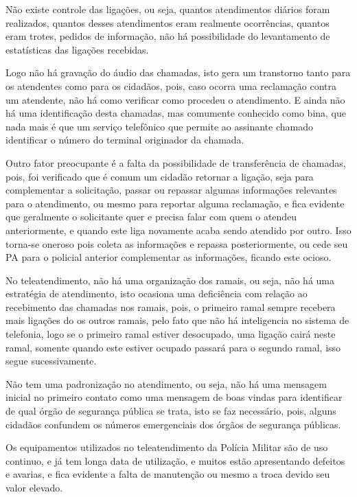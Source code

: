 Não existe controle das ligações, ou seja, quantos atendimentos diários foram realizados, quantos desses atendimentos eram realmente ocorrências, quantos eram trotes, pedidos de informação, não há possibilidade do levantamento de estatísticas das ligações recebidas.

Logo não há gravação do áudio das chamadas, isto gera um transtorno tanto para os atendentes como para os cidadãos, pois, caso ocorra uma reclamação contra um atendente, não há como verificar como procedeu o atendimento. E ainda não há uma identificação desta chamadas, mas comumente conhecido como bina, que nada mais é que um serviço telefônico que permite ao assinante chamado identificar o número do terminal originador da chamada.

Outro fator preocupante é a falta da possibilidade de transferência de chamadas, pois, foi verificado que é comum um cidadão retornar a ligação, seja para complementar a solicitação, passar ou repassar algumas informações relevantes para o atendimento, ou mesmo para reportar alguma reclamação, e fica evidente que geralmente o solicitante quer e precisa falar com quem o atendeu anteriormente, e quando este liga novamente acaba sendo atendido por outro. Isso torna-se oneroso pois coleta as informações e repassa posteriormente, ou cede seu PA para o policial anterior complementar as informações, ficando este ocioso.

No teleatendimento, não há uma organização dos ramais, ou seja, não há uma estratégia de atendimento, isto ocasiona uma deficiência com relação ao recebimento das chamadas nos ramais, pois, o primeiro ramal sempre recebera mais ligações do os outros ramais, pelo fato que não há inteligencia no sistema de telefonia, logo se o primeiro ramal estiver desocupado, uma ligação cairá neste ramal, somente quando este estiver ocupado passará para o segundo ramal, isso segue sucessivamente.

Não tem uma padronização no atendimento, ou seja, não há uma mensagem inicial no primeiro contato como uma mensagem de boas vindas para identificar de qual órgão de segurança pública se trata, isto se faz necessário, pois, alguns cidadãos confundem os números emergenciais dos órgãos de segurança públicas.

Os equipamentos utilizados no teleatendimento da Polícia Militar são de uso continuo, e já tem longa data de utilização, e muitos estão apresentando defeitos e avarias, e fica evidente a falta de manutenção ou mesmo a troca devido seu valor elevado.

